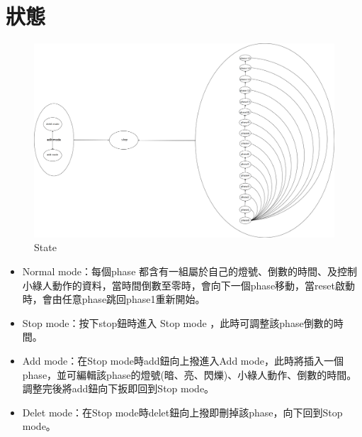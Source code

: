 \documentclass[11pt,a4paper]{article}
\begin{document}
\section{狀態}
\begin{figure}[H]
  \centering
  \includegraphics[width=18cm]{state}
  \caption{State}
\end{figure}
\begin{itemize}
\item Normal mode：每個phase 都含有一組屬於自己的燈號、倒數的時間、及控制小綠人動作的資料，當時間倒數至零時，會向下一個phase移動，當reset啟動時，會由任意phase跳回phase1重新開始。
\item Stop mode：按下stop鈕時進入 Stop mode ，此時可調整該phase倒數的時間。
\item Add mode：在Stop mode時add鈕向上撥進入Add mode，此時將插入一個phase，並可編輯該phase的燈號(暗、亮、閃爍)、小綠人動作、倒數的時間。調整完後將add鈕向下扳即回到Stop mode。
\item Delet mode：在Stop mode時delet鈕向上撥即刪掉該phase，向下回到Stop mode。
\end{itemize}
\end{document}
